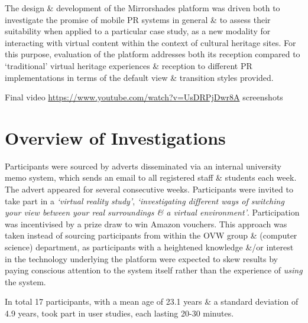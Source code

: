 The design \& development of the Mirrorshades platform was driven both to investigate the promise of mobile PR systems in general \& to assess their suitability when applied to a particular case study, as a new modality for interacting with virtual content within the context of cultural heritage sites. For this purpose, evaluation of the platform addresses both its reception compared to `traditional' virtual heritage experiences \& reception to different PR implementations in terms of the default view \& transition styles provided.


Final video
\url{https://www.youtube.com/watch?v=UsDRPjDwr8A}
screenshots


\section{Overview of Investigations}

Participants were sourced by adverts disseminated via an internal university memo system, which sends an email to all registered staff \& students each week. The advert appeared for several consecutive weeks. Participants were invited to take part in a \textit{`virtual reality study'}, \textit{`investigating different ways of switching your view between your real surroundings \& a virtual environment'}. Participation was incentivised by a prize draw to win Amazon vouchers. This approach was taken instead of sourcing participants from within the OVW group \& (computer science) department, as participants with a heightened knowledge \&/or interest in the technology underlying the platform were expected to skew results by paying conscious attention to the system itself rather than the experience of \textit{using} the system.

In total 17 participants, with a mean age of 23.1 years \& a standard deviation of 4.9 years, took part in user studies, each lasting 20-30 minutes.









